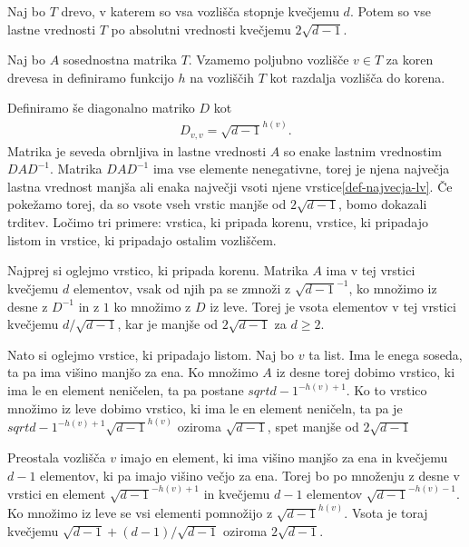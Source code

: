 \begin{izrek}
    Naj bo \(T\) drevo, v katerem so vsa vozlišča stopnje kvečjemu \(d\). Potem so vse lastne vrednosti \(T\) po absolutni vrednosti kvečjemu \(2\sqrt{d-1}\).
\end{izrek}
\begin{dokaz}
    Naj bo \(A\) sosednostna matrika \(T\). Vzamemo poljubno vozlišče \(v\in T\) za koren drevesa in definiramo funkcijo \(h\) na vozliščih \(T\) kot razdalja vozlišča do korena.

    Definiramo še diagonalno matriko \(D\) kot
    \begin{align*}
        D_{v, v} = \sqrt{d-1}^{h(v)}.
    \end{align*}
    Matrika je seveda obrnljiva in lastne vrednosti \(A\) so enake lastnim vrednostim \(D A D^{-1}\). Matrika \(DAD^{-1}\) ima vse elemente nenegativne, torej je njena največja lastna vrednost manjša ali enaka največji vsoti njene vrstice\ref{def-najvecja-lv}. Če pokežamo torej, da so vsote vseh vrstic manjše od \(2\sqrt{d-1}\), bomo dokazali trditev. Ločimo tri primere: vrstica, ki pripada korenu, vrstice, ki pripadajo listom in vrstice, ki pripadajo ostalim vozliščem.

    Najprej si oglejmo vrstico, ki pripada korenu. Matrika \(A\) ima v tej vrstici kvečjemu \(d\) elementov, vsak od njih pa se zmnoži z \(\sqrt{d-1}^{-1}\), ko množimo iz desne z \(D^{-1}\) in z \(1\) ko množimo z \(D\) iz leve. Torej je vsota elementov v tej vrstici kvečjemu \(d/\sqrt{d-1}\), kar je manjše od \(2\sqrt{d-1}\) za \(d\geq 2\).

    Nato si oglejmo vrstice, ki pripadajo listom. Naj bo \(v\) ta list. Ima le enega soseda, ta pa ima višino manjšo za ena. Ko množimo \(A\) iz desne torej dobimo vrstico, ki ima le en element neničelen, ta pa postane \(sqrt{d-1}^{-h(v)+1}\). Ko to vrstico množimo iz leve dobimo vrstico, ki ima le en element neničeln, ta pa je \(sqrt{d-1}^{-h(v)+1}\sqrt{d-1}^{h(v)}\) oziroma \(\sqrt{d-1}\), spet manjše od \(2\sqrt{d-1}\)

    Preostala vozlišča \(v\) imajo en element, ki ima višino manjšo za ena in kvečjemu \(d-1\) elementov, ki pa imajo višino večjo za ena. Torej bo po množenju z desne v vrstici en element \(\sqrt{d-1}^{-h(v)+1}\) in kvečjemu \(d-1\) elementov \(\sqrt{d-1}^{-h(v)-1}\). Ko množimo iz leve se vsi elementi pomnožijo z \(\sqrt{d-1}^{h(v)}\). Vsota je toraj kvečjemu \(\sqrt{d-1} + (d-1)/\sqrt{d-1}\) oziroma \(2\sqrt{d-1}\).
\end{dokaz}

